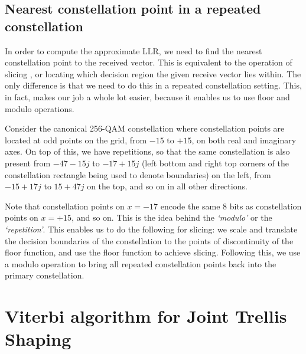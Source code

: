 \subsection{Nearest constellation point in a repeated constellation}

In order to compute the approximate LLR, we need to find the nearest
constellation point to the received vector. This is equivalent to the operation
of slicing , or locating which decision region the given receive vector lies
within. The only difference is that we need to do this in a repeated
constellation setting. This, in fact, makes our job a whole lot easier, because
it enables us to use floor and modulo operations.


Consider the canonical 256-QAM constellation where constellation points are
located at odd points on the grid, from $-15$ to $+15$, on both real and
imaginary axes. On top of this, we have repetitions, so that the same
constellation is also present from $-47-15j$ to $-17+15j$ (left bottom and
right top corners of the constellation rectangle being used to denote
boundaries) on the left, from $-15+17j$ to $15+47j$ on the top, and so on in
all other directions.

Note that constellation points on $x=-17$ encode the same 8 bits as
constellation points on $x=+15$, and so on. This is the idea behind the
\emph{`modulo'} or the \emph{`repetition'}. This enables us to do the following
for slicing: we scale and translate the decision boundaries of the
constellation to the points of discontinuity of the floor function, and use the
floor function to achieve slicing. Following this, we use a modulo operation to
bring all repeated constellation points back into the primary constellation.



\section{Viterbi algorithm for Joint Trellis Shaping}


